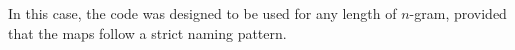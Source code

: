 In this case, the code was designed to be used for any length of $n$-gram, provided that the maps follow a strict naming pattern. 

%
%
%



